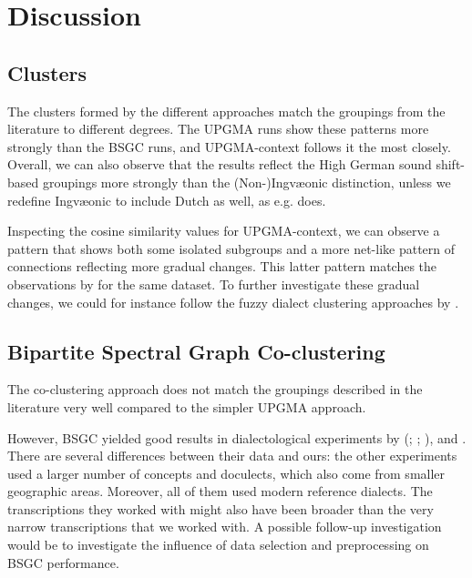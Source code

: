 \documentclass[a4paper, 11pt]{article}
\begin{document}
\section{Discussion}

\subsection{Clusters}

The clusters formed by the different approaches
match the groupings from the literature to different degrees.
The UPGMA runs show these patterns more strongly than the BSGC runs,
and UPGMA-context follows it the most closely.
Overall, we can also observe that the results reflect
the High German sound shift-based groupings more
strongly than the (Non-)Ingv\ae{}onic distinction,
unless we redefine Ingv\ae{}onic to include Dutch as well,
as e.g. \citet{sonderegger1979grundzuege} does.

Inspecting the cosine similarity values
for UPGMA-context, we can observe a pattern
that shows both some isolated subgroups and
a more net-like pattern of connections
reflecting more gradual changes.
This latter pattern matches the observations
by \citet{heggarty2010splits} for the same dataset.
To further investigate these gradual changes,
we could for instance follow the fuzzy dialect clustering approaches
by \citet{proell2013detecting}.

\subsection{Bipartite Spectral Graph Co-clustering}

The co-clustering approach
does not match the groupings described in the literature very well
compared to the simpler UPGMA approach.

However, BSGC yielded good results in dialectological experiments by
\citeauthor{wieling2011bipartite}
(\citeyear{wieling2009bipartite}; \citeyear{wieling2010hierarchical}; \citeyear{wieling2011bipartite}),
\citet{wieling2013analyzing} and \citet{montemagni2013synchronic}.
There are several differences between their data and ours: the other experiments used a larger number
of concepts and doculects, which also come from smaller geographic areas.
Moreover, all of them used modern reference dialects.
The transcriptions they worked with might also have been broader than the very narrow transcriptions that we worked with.
A possible follow-up investigation would be to investigate the influence of
data selection and preprocessing on BSGC performance.
\end{document}
